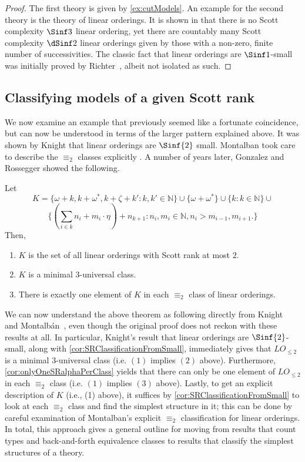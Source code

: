 \documentclass{amsart}
\renewcommand{\-}{\text{-}}
\begin{document}
\begin{proof}
  The first theory is given by \cref{ex:cutModels}. An example for the second theory is the theory of linear orderings.
It is shown in \cite{GR24} that there is no Scott complexity $\Sinf3$ linear ordering, yet there are countably many Scott complexity $\dSinf2$ linear orderings given by those with a non-zero, finite number of successivities.
The classic fact that linear orderings are $\Sinf1$-small was initially proved by Richter~\cite{richter1981}, albeit not isolated as such.
\end{proof}

\subsection{Classifying models of a given Scott rank}

We now examine an example that previously seemed like a fortunate coincidence, but can now be understood in terms of the larger pattern explained above.
It was shown by Knight \cite{Kni86} that linear orderings are $\Sinf{2}$ small.
Montalban took care to describe the $\equiv_2$ classes explicitly \cite[Section 4]{McountingBF}.
A number of years later, Gonzalez and Rossegger showed the following.
\begin{theorem}
Let
\[K=\{\omega+k, k+\omega^*, k+\zeta+k':k,k'\in\mathbb N\}\cup\{\omega+\omega^*\}\cup\{k:k\in\mathbb N\}\cup\]
\[\{(\sum_{i\in k} n_i + m_i\cdot\eta )+n_{k+1}:n_i,m_i\in\mathbb N,
n_i>m_{i-1},m_{i+1}.\}\]
Then,
\begin{enumerate}
	\item $K$ is the set of all linear orderings with Scott rank at most $2$.
	\item $K$ is a minimal $3$-universal class.
	\item There is exactly one element of $K$ in each $\equiv_2$ class of linear orderings.
\end{enumerate}
\end{theorem}
We can now understand the above theorem as following directly from Knight~\cite{Kni86} and Montalbán~\cite[Section 4]{McountingBF}, even though the original proof does not reckon with these results at all.
In particular, Knight's result that linear orderings are $\Sinf{2}$-small, along with \cref{cor:SRClassificationFromSmall}, immediately gives that $LO_{\leq2}$ is a minimal $3$-universal class (i.e. $(1)$ implies $(2)$ above).
Furthermore, \cref{cor:onlyOneSRalphaPerClass} yields that there can only be one element of $LO_{\leq2}$ in each $\equiv_2$ class (i.e. $(1)$ implies $(3)$ above).
Lastly, to get an explicit description of $K$ (i.e., (1) above), it suffices by \cref{cor:SRClassificationFromSmall} to look at each $\equiv_2$ class and find the simplest structure in it; this can be done by careful examination of Montalban's explicit $\equiv_2$ classification for linear orderings.
In total, this approach gives a general outline for moving from results that count types and back-and-forth equivalence classes to results that classify the simplest structures of a theory.
\end{document}
